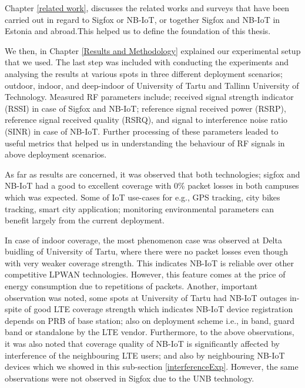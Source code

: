 \documentclass[12pt]{article}
\begin{document}
Chapter \ref{related work}, discusses the related works and surveys that have been carried out in regard to Sigfox or NB-IoT, or together Sigfox and NB-IoT in Estonia and abroad.This helped us to define the foundation of this thesis.\par

We then, in Chapter \ref{Results and Methodology} explained our experimental setup that we used. The last step was included with conducting the experiments and analysing the results at various spots in three different deployment scenarios; outdoor, indoor, and deep-indoor of University of Tartu and Tallinn University of Technology. Measured RF parameters include; received signal strength indicator (RSSI) in case of Sigfox and NB-IoT; reference signal received power (RSRP), reference signal received quality (RSRQ), and signal to interference noise ratio (SINR) in case of NB-IoT. Further processing  of these parameters leaded to useful metrics that helped us in understanding the behaviour of RF signals in above deployment scenarios.

As far as results are concerned, it was observed that both technologies; sigfox and NB-IoT had a good to excellent coverage with 0\% packet losses in both campuses which was expected. Some of IoT use-cases for e.g., GPS tracking, city bikes tracking, smart city application; monitoring environmental parameters can benefit largely from the current deployment.\par

In case of indoor coverage, the most phenomenon case was observed at Delta buidling of University of Tartu, where there were no packet losses even though with very weaker coverage strength. This indicates NB-IoT is reliable over other competitive LPWAN technologies. However, this feature comes at the price of energy consumption due to repetitions of packets. Another, important observation was noted, some spots at University of Tartu had NB-IoT outages in-spite of good LTE coverage strength which indicates NB-IoT device registration depends on PRB of base station; also on deployment scheme i.e., in band, guard band or standalone by the LTE vendor. Furthermore, to the above observations, it was also noted that coverage quality of NB-IoT is significantly affected by interference of the neighbouring LTE users; and also by neighbouring NB-IoT devices which we showed in this sub-section \ref{interferenceExp}. However, the same observations were not observed in Sigfox due to the UNB technology.\par
\end{document}
